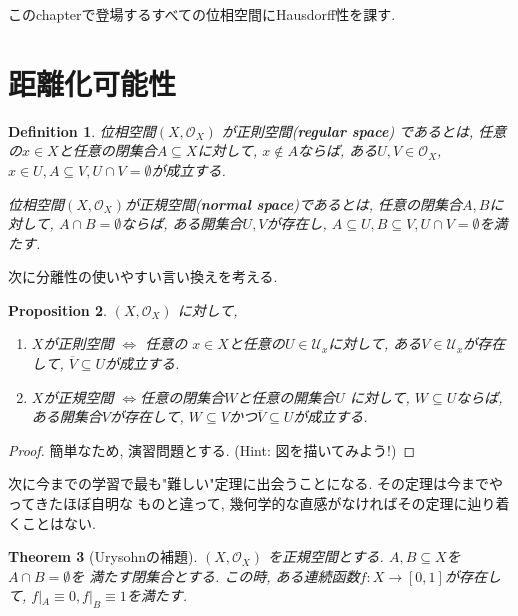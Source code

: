 \documentclass[lualatex]{ltjsbook}
\newcommand{\cl}[1]{\overline{ #1}  }
\newtheorem{theorem}{Theorem}[chapter]
\newtheorem{definition}[theorem]{Definition}
\newtheorem{proposition}[theorem]{Proposition}
\theoremstyle{remark}
\theoremstyle{plain}
\begin{document}
このchapterで登場するすべての位相空間にHausdorff性を課す. 

\section{距離化可能性}
\begin{definition}
  位相空間$\left( X , \mathcal{O}_{X} \right)$ が正則空間(\textbf{regular space}) であるとは, 
  任意の$x \in X$と任意の閉集合$A \subseteq X$に対して, $x \not\in A$ならば, ある$U ,V \in \mathcal{O}_X$, $x \in U, A \subseteq V, U \cap V =\emptyset$が成立する. 


  位相空間$\left( X , \mathcal{O}_{X} \right)$が正規空間(\textbf{normal space})であるとは, 
  任意の閉集合$A,B$に対して,  $A \cap B = \emptyset$ならば, ある開集合$U,V$が存在し, 
   $A \subseteq U, B \subseteq V, U \cap V =\emptyset$を満たす.
\end{definition}

次に分離性の使いやすい言い換えを考える. 
\begin{proposition}
 $\left( X , \mathcal{O}_{X} \right)$ に対して, 
 \begin{enumerate}
   \item $X$が正則空間  $\iff$ 任意の $x \in X$と任意の$U \in \mathcal{U}_x$に対して, ある$V \in \mathcal{U}_x$が存在して, 
     $\cl{V} \subseteq U$が成立する. 
   \item $X$が正規空間  $\iff$任意の閉集合$W$と任意の開集合$U$ に対して, $W \subseteq U$ならば, ある開集合$V$が存在して, 
     $W \subseteq V$かつ$\cl{V} \subseteq U $が成立する. 
 \end{enumerate}
\end{proposition}

\begin{proof}
  簡単なため, 演習問題とする. (Hint: 図を描いてみよう!)
\end{proof}

次に今までの学習で最も"難しい"定理に出会うことになる. その定理は今までやってきたほぼ自明な
ものと違って, 幾何学的な直感がなければその定理に辿り着くことはない. 

\begin{theorem}[Urysohnの補題]
\label{theorem:Urysohn}
  $\left( X , \mathcal{O}_{X} \right)$ を正規空間とする. $A,B \subseteq X$を$A \cap B = \emptyset$を
  満たす閉集合とする. この時, ある連続函数$f :X \to [0,1]$が存在して, $f|_A \equiv 0, f|_B \equiv 1$を満たす. 
\end{theorem}
\end{document}
